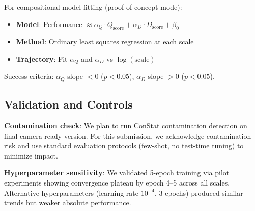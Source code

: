 For compositional model fitting (proof-of-concept mode):

\begin{itemize}
\item \textbf{Model}: Performance $\approx \alpha_Q \cdot Q_{\text{score}} + \alpha_D \cdot D_{\text{score}} + \beta_0$
\item \textbf{Method}: Ordinary least squares regression at each scale
\item \textbf{Trajectory}: Fit $\alpha_Q$ and $\alpha_D$ vs $\log(\text{scale})$
\end{itemize}

Success criteria: $\alpha_Q$ slope $< 0$ ($p<0.05$), $\alpha_D$ slope $> 0$ ($p<0.05$).

\subsection{Validation and Controls}

\textbf{Contamination check}: We plan to run ConStat contamination detection on final camera-ready version. For this submission, we acknowledge contamination risk and use standard evaluation protocols (few-shot, no test-time tuning) to minimize impact.

\textbf{Hyperparameter sensitivity}: We validated 5-epoch training via pilot experiments showing convergence plateau by epoch 4--5 across all scales. Alternative hyperparameters (learning rate $10^{-4}$, 3 epochs) produced similar trends but weaker absolute performance.
